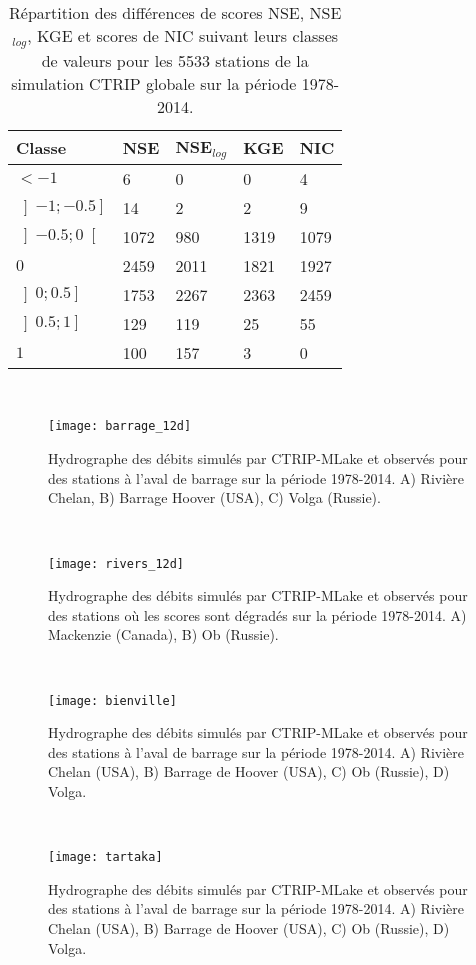 \begin{table}[h!]
 \caption{Répartition des différences de scores NSE, NSE$_{log}$, KGE et scores de NIC suivant leurs classes de valeurs pour les 5533 stations de la simulation CTRIP globale sur la période 1978-2014.}
 \label{ctrip_classe_globe}
 \begin{tabularx}{\textwidth}{XXXXX}
 \hline
 Classe &NSE&NSE$_{log}$&KGE&NIC\\
 \hline
    $< -1$ &6&0&0&4\\
    $\left]-1;-0.5\right]$ &14&2&2&9\\
    $\left]-0.5;0\right[$ &1072&980&1319&1079\\
    $0$ &2459&2011&1821&1927\\
    $\left]0;0.5\right]$ &1753&2267&2363&2459\\
    $\left]0.5;1\right]$ &129&119&25&55\\
    $1$ &100&157&3&0\\
  \hline
 \end{tabularx}
\end{table}

~\\

\begin{figure}
\centering
\texttt{[image: barrage\_12d]}
\caption{Hydrographe des débits simulés par CTRIP-MLake et observés pour des stations à l'aval de barrage sur la période 1978-2014. A) Rivière Chelan, B) Barrage Hoover (USA), C) Volga (Russie).}
\label{barrage_12d}
\end{figure}

~\\

\begin{figure}
\centering
\texttt{[image: rivers\_12d]}
\caption{Hydrographe des débits simulés par CTRIP-MLake et observés pour des stations où les scores sont dégradés sur la période 1978-2014. A) Mackenzie (Canada), B) Ob (Russie).}
\label{rivers}
\end{figure}

~\\

\begin{figure}
\texttt{[image: bienville]}
\caption{Hydrographe des débits simulés par CTRIP-MLake et observés pour des stations à l'aval de barrage sur la période 1978-2014. A) Rivière Chelan (USA), B) Barrage de Hoover (USA), C) Ob (Russie), D) Volga.}
\label{bienville}
\end{figure}

~\\

\begin{figure}
\texttt{[image: tartaka]}
\caption{Hydrographe des débits simulés par CTRIP-MLake et observés pour des stations à l'aval de barrage sur la période 1978-2014. A) Rivière Chelan (USA), B) Barrage de Hoover (USA), C) Ob (Russie), D) Volga.}
\label{tartake}
\end{figure}

~\\
